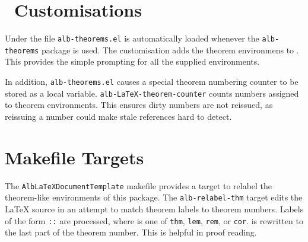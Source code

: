 \documentclass[11pt,a4paper,oneside,titlepage]{alb-corp}
\begin{document}

\section{\AUCTeX\ Customisations}
\label{sec:alb-theorems-documentation:auctex-cust}

Under \AUCTeX{} the file \texttt{alb-theorems.el} is automatically
loaded whenever the \texttt{alb-theorems} package is used.  The
customisation adds the theorem environmens to \AUCTeX{}.  This provides
the simple prompting for all the supplied environments.

In addition, \texttt{alb-theorems.el} causes a special theorem numbering
counter to be stored as a local variable.
\texttt{alb-LaTeX-theorem-counter} counts numbers assigned to theorem
environments.  This ensures dirty numbers are not reissued, as reissuing
a number could make stale references hard to detect.




\section{Makefile Targets}
\label{sec:alb-theorems-documentation:makef-targ}

The \texttt{AlbLaTeXDocumentTemplate} makefile provides a target to
relabel the theorem-like environments of this package.  The
\texttt{alb-relabel-thm} target edits the \LaTeX{} source in an attempt
to match theorem labels to theorem numbers.  Labels of the form
\texttt{:}\texttt{:}
are processed, where  is one of \texttt{thm},
\texttt{lem}, \texttt{rem}, or \texttt{cor}.  is
rewritten to the last part of the theorem number.  This is helpful in
proof reading.
\end{document}
